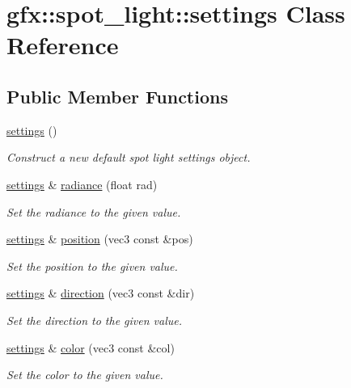\hypertarget{classgfx_1_1spot__light_1_1settings}{\section{gfx\-:\-:spot\-\_\-light\-:\-:settings Class Reference}
\label{classgfx_1_1spot__light_1_1settings}
}
\subsection*{Public Member Functions}
\begin{DoxyCompactItemize}
\item 
\hyperlink{classgfx_1_1spot__light_1_1settings_aafaf46e4e6523f7e6aa57d1619b339bf}{settings} ()
\begin{DoxyCompactList}\small\item\em Construct a new default spot light settings object. \end{DoxyCompactList}\item 
\hyperlink{classgfx_1_1spot__light_1_1settings}{settings} \& \hyperlink{classgfx_1_1spot__light_1_1settings_a5084aff42751be9d5d0698d9756e86f7}{radiance} (float rad)
\begin{DoxyCompactList}\small\item\em Set the radiance to the given value. \end{DoxyCompactList}\item 
\hyperlink{classgfx_1_1spot__light_1_1settings}{settings} \& \hyperlink{classgfx_1_1spot__light_1_1settings_a3ebbf32530285712c5b87af1a92ee769}{position} (vec3 const \&pos)
\begin{DoxyCompactList}\small\item\em Set the position to the given value. \end{DoxyCompactList}\item 
\hyperlink{classgfx_1_1spot__light_1_1settings}{settings} \& \hyperlink{classgfx_1_1spot__light_1_1settings_a79e2d798b23cd5a527313bf4b7416d2a}{direction} (vec3 const \&dir)
\begin{DoxyCompactList}\small\item\em Set the direction to the given value. \end{DoxyCompactList}\item 
\hyperlink{classgfx_1_1spot__light_1_1settings}{settings} \& \hyperlink{classgfx_1_1spot__light_1_1settings_a415c999dab2c8a8678c37035caee616f}{color} (vec3 const \&col)
\begin{DoxyCompactList}\small\item\em Set the color to the given value. \end{DoxyCompactList}\item 

\end{DoxyCompactItemize}
